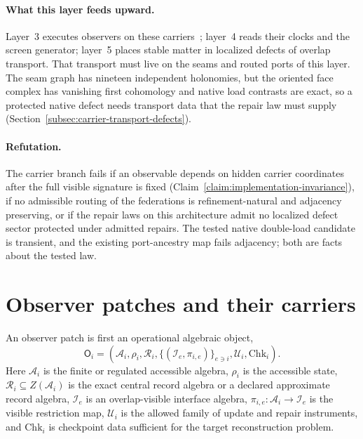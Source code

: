 \documentclass[11pt]{article}
\theoremstyle{remark}
\theoremstyle{plain}
\begin{document}
\paragraph{What this layer feeds upward.}
Layer~3 executes observers on these carriers~\cite{ophmodel}; layer~4 reads
their clocks and the screen generator; layer~5 places stable matter in
localized defects of overlap transport. That transport must live on the
seams and routed ports of this layer. The seam graph has nineteen
independent holonomies, but the oriented face complex has vanishing first
cohomology and native load contrasts are exact, so a protected native
defect needs transport data that the repair law must supply
(Section~\ref{subsec:carrier-transport-defects}).

\paragraph{Refutation.}
The carrier branch fails if an observable depends on hidden carrier
coordinates after the full visible signature is fixed
(Claim~\ref{claim:implementation-invariance}), if no admissible routing of
the federations is refinement-natural and adjacency preserving, or if the
repair laws on this architecture admit no localized defect sector protected
under admitted repairs. The tested native double-load candidate is
transient, and the existing port-ancestry map fails adjacency; both are
facts about the tested law.





\tableofcontents
\newpage
\section{Observer patches and their carriers}
\label{sec:observer-patch-semantics}

An observer patch is first an operational algebraic object,
\[
\mathsf O_i=
\left(
\mathcal A_i,\rho_i,\mathcal R_i,
\{(\mathcal I_e,\pi_{i,e})\}_{e\ni i},
\mathcal U_i,\mathrm{Chk}_i
\right).
\]
Here \(\mathcal A_i\) is the finite or regulated accessible algebra, \(\rho_i\) is the accessible
state, \(\mathcal R_i\subseteq Z(\mathcal A_i)\) is the exact central record algebra or a declared
approximate record algebra, \(\mathcal I_e\) is an overlap-visible interface algebra,
\(\pi_{i,e}:\mathcal A_i\to\mathcal I_e\) is the visible restriction map, \(\mathcal U_i\) is the
allowed family of update and repair instruments, and \(\mathrm{Chk}_i\) is checkpoint data
sufficient for the target reconstruction problem.
\end{document}
